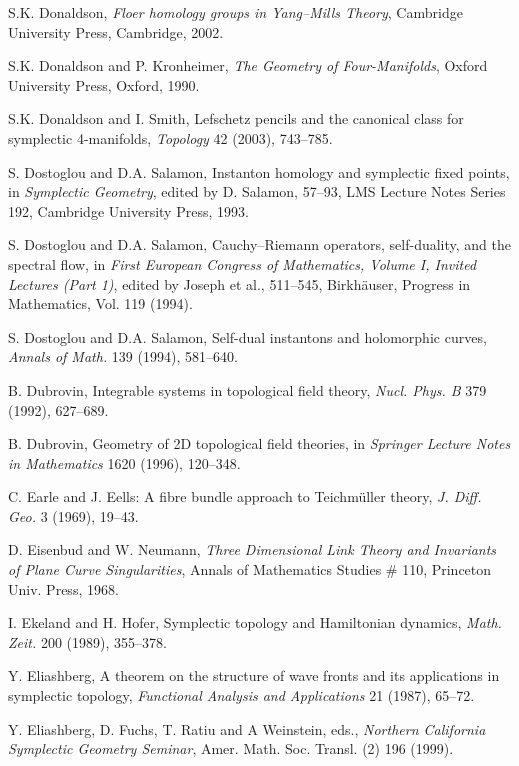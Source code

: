  S.K. Donaldson, \emph{Floer homology groups in Yang–Mills Theory}, Cambridge University Press, Cambridge, 2002.

 S.K. Donaldson and P. Kronheimer, \emph{The Geometry of Four-Manifolds}, Oxford University Press, Oxford, 1990.

 S.K. Donaldson and I. Smith, Lefschetz pencils and the canonical class for symplectic 4-manifolds, \emph{Topology} 42 (2003), 743–785.

 S. Dostoglou and D.A. Salamon, Instanton homology and symplectic fixed points, in \emph{Symplectic Geometry}, edited by D. Salamon, 57–93, LMS Lecture Notes Series 192, Cambridge University Press, 1993.

 S. Dostoglou and D.A. Salamon, Cauchy–Riemann operators, self-duality, and the spectral flow, in \emph{First European Congress of Mathematics, Volume I, Invited Lectures (Part 1)}, edited by Joseph et al., 511–545, Birkhäuser, Progress in Mathematics, Vol. 119 (1994).

 S. Dostoglou and D.A. Salamon, Self-dual instantons and holomorphic curves, \emph{Annals of Math.} 139 (1994), 581–640.

 B. Dubrovin, Integrable systems in topological field theory, \emph{Nucl. Phys. B} 379 (1992), 627–689.

 B. Dubrovin, Geometry of 2D topological field theories, in \emph{Springer Lecture Notes in Mathematics} 1620 (1996), 120–348.

 C. Earle and J. Eells: A fibre bundle approach to Teichmüller theory, \emph{J. Diff. Geo.} 3 (1969), 19–43.

 D. Eisenbud and W. Neumann, \emph{Three Dimensional Link Theory and Invariants of Plane Curve Singularities}, Annals of Mathematics Studies \# 110, Princeton Univ. Press, 1968.

 I. Ekeland and H. Hofer, Symplectic topology and Hamiltonian dynamics, \emph{Math. Zeit.} 200 (1989), 355–378.

 Y. Eliashberg, A theorem on the structure of wave fronts and its applications in symplectic topology, \emph{Functional Analysis and Applications} 21 (1987), 65–72.

 Y. Eliashberg, D. Fuchs, T. Ratiu and A Weinstein, eds., \emph{Northern California Symplectic Geometry Seminar}, Amer. Math. Soc. Transl. (2) 196 (1999).

